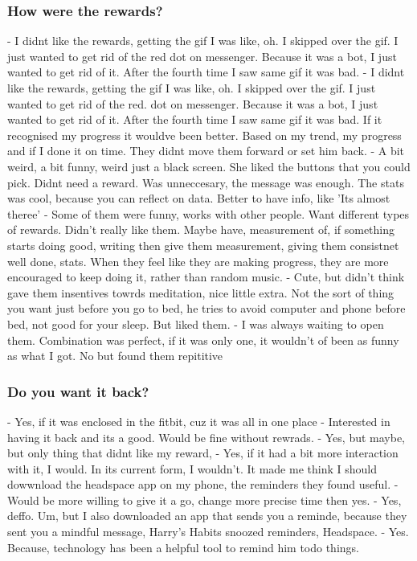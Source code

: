\documentclass{scaffold/sigchi}
\begin{document}
\subsubsection{How were the rewards?}

  - I didnt like the rewards, getting the gif I was like, oh. I skipped over the gif. I just wanted to get rid of the red dot on messenger. Because it was a bot, I just wanted to get rid of it. After the fourth time I saw same gif it was bad.
  - I didnt like the rewards, getting the gif I was like, oh. I skipped over the gif. I just wanted to get rid of the red. dot on messenger. Because it was a bot, I just wanted to get rid of it. After the fourth time I saw same gif it was bad. If it recognised my progress it wouldve been better. Based on my trend, my progress and if I done it on time. They didnt move them forward or set him back.
  - A bit weird, a bit funny, weird just a black screen. She liked the buttons that you could pick. Didnt need a reward. Was unneccesary, the message was enough. The stats was cool, because you can reflect on data. Better to have info, like 'Its almost theree'
  - Some of them were funny, works with other people. Want different types of rewards. Didn't really like them. Maybe have, measurement of, if something starts doing good, writing then give them measurement, giving them consistnet well done, stats. When they feel like they are making progress, they are more encouraged to keep doing it, rather than random music.
  - Cute, but didn't think gave them insentives towrds meditation, nice little extra. Not the sort of thing you want just before you go to bed, he tries to avoid computer and phone before bed, not good for your sleep. But liked them.
  - I was always waiting to open them. Combination was perfect, if it was only one, it wouldn't of been as funny as what I got. No but found them repititive


\subsubsection{Do you want it back?}

  - Yes, if it was enclosed in the fitbit, cuz it was all in one place
  - Interested in having it back and its a good. Would be fine without rewrads.
  - Yes, but maybe, but only thing that didnt like my reward,
  - Yes, if it had a bit more interaction with it, I would. In its current form, I wouldn't. It made me think I should dowwnload the headspace app on my phone, the reminders they found useful.
  - Would be more willing to give it a go, change more precise time then yes.
  - Yes, deffo. Um, but I also downloaded an app that sends you a reminde, because they sent you a mindful message, Harry's Habits snoozed reminders, Headspace.
  - Yes. Because, technology has been a helpful tool to remind him todo things.
\end{document}
